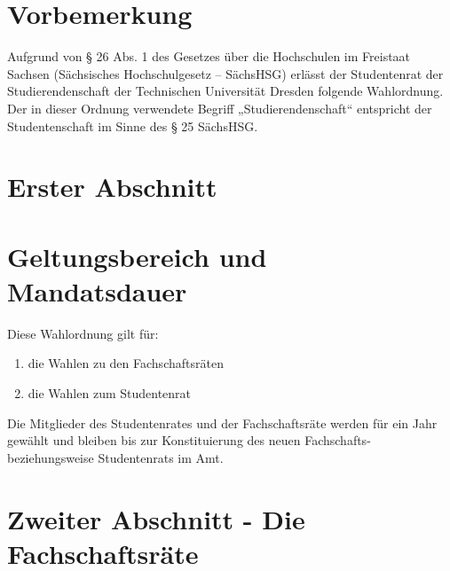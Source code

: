 \setcounter{section}{0} %
\begin{multicols}{2}

\section*{Vorbemerkung}
\Satz Aufgrund von § 26 Abs. 1 des Gesetzes über die Hochschulen im Freistaat Sachsen (Sächsisches Hochschulgesetz – SächsHSG) erlässt der Studentenrat der Studierendenschaft der Technischen Universität Dresden folgende Wahlordnung. Der in dieser Ordnung verwendete Begriff „Studierendenschaft“ entspricht der Studentenschaft im Sinne des § 25 SächsHSG.



\section*{Erster Abschnitt}

\section{Geltungsbereich und Mandatsdauer}

\Abs \Satz Diese Wahlordnung gilt für:
\begin{enumerate}
\item die Wahlen zu den Fachschaftsräten
\item die Wahlen zum Studentenrat
\end{enumerate}

\Abs \Satz Die Mitglieder des Studentenrates und der Fachschaftsräte werden für ein Jahr gewählt und bleiben bis zur Konstituierung des neuen Fachschafts- beziehungsweise Studentenrats im Amt.

\section*{Zweiter Abschnitt - Die Fachschaftsräte}

\end{multicols}
